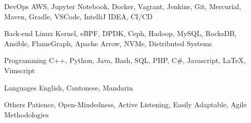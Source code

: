 

\begin{cvskills}

  \cvskill
    {DevOps} %
    {AWS, Jupyter Notebook, Docker, Vagrant, Jenkins, Git, Mercurial, Maven, Gradle, VSCode, IntelliJ IDEA, CI/CD} %

  \cvskill
    {Back-end} %
    {Linux Kernel, eBPF, DPDK, Ceph, Hadoop, MySQL, RocksDB, Ansible, FlameGraph, Apache Arrow, NVMe, Distributed Systems} %

  \cvskill
    {Programming} %
    {C++, Python, Java, Bash, SQL, PHP, C\#, Javascript, LaTeX, Vimscript} %

  \cvskill
    {Languages} %
    {English, Cantonese, Mandarin} %

  \cvskill
    {Others} %
    {Patience, Open-Mindedness, Active Listening, Easily Adaptable, Agile Methodologies} %

\end{cvskills}
